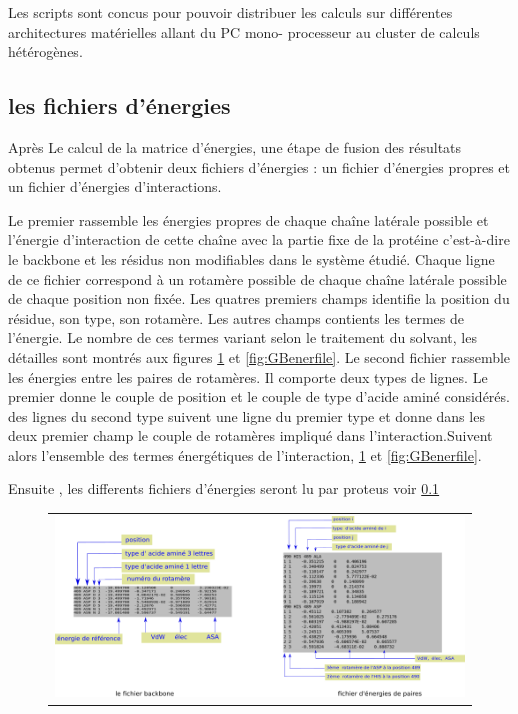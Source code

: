 \begin{enumerate}
Les scripts sont concus pour pouvoir distribuer les calculs sur différentes architectures matérielles allant du PC mono- processeur au cluster de calculs hétérogènes.

\subsection{les fichiers d'énergies}

Après Le calcul de la matrice d'énergies, une étape de fusion des résultats obtenus permet d'obtenir deux fichiers d'énergies : un fichier d'énergies propres et un fichier d'énergies d'interactions.

Le premier rassemble les énergies propres de chaque chaîne latérale possible et l'énergie d'interaction de cette chaîne avec la partie fixe de la protéine c'est-à-dire le backbone et les résidus non modifiables dans le système étudié. Chaque ligne de ce fichier correspond à un rotamère possible de chaque chaîne latérale possible de chaque position non fixée. Les quatres premiers champs identifie la position du résidue, son type, son rotamère. Les autres champs contients les termes de l'énergie. Le nombre de ces termes variant selon le traitement du solvant, les détailles sont montrés aux figures \ref{fig:CAenerfile} et \ref{fig:GBenerfile}.   
Le second fichier rassemble les énergies entre les paires de rotamères. Il comporte deux types de lignes. Le premier donne le couple de position et le couple de type d'acide aminé considérés. des lignes du second type suivent une ligne du premier type et donne dans les deux premier champ le couple de rotamères impliqué dans l'interaction.Suivent alors l'ensemble des termes énergétiques de l'interaction, \ref{fig:CAenerfile} et \ref{fig:GBenerfile}. 


Ensuite , les differents fichiers d'énergies seront lu par proteus voir \ref{} 


   \begin{figure}[!htbp]
     \centering
     \begin{tabular}{c}
       \includegraphics[width=12cm]{figure/inputener.png} 
     \end{tabular}     
     \caption{}
\label{fig:CAenerfile}
   \end{figure}



\end{enumerate}
